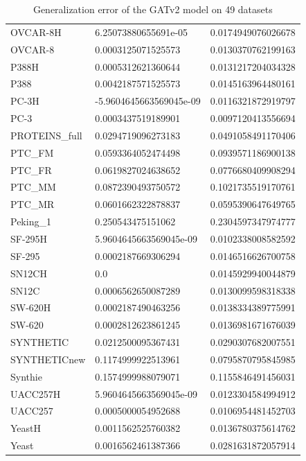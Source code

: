 \begin{table}[!ht]
\begin{tabular}{p{3.5cm}|p{5cm}p{5cm}}
    OVCAR-8H & 6.25073880655691e-05 & 0.0174949076026678 \\ 
    OVCAR-8 & 0.0003125071525573 & 0.0130370762199163 \\ 
    P388H & 0.0005312621360644 & 0.0131217204034328 \\ 
    P388 & 0.0042187571525573 & 0.0145163964480161 \\ 
    PC-3H & -5.9604645663569045e-09 & 0.0116321872919797 \\ 
    PC-3 & 0.0003437519189901 & 0.0097120413556694 \\ 
    PROTEINS\_full & 0.0294719096273183 & 0.0491058491170406 \\ 
    PTC\_FM & 0.0593364052474498 & 0.0939571186900138 \\ 
    PTC\_FR & 0.0619827024638652 & 0.0776680409908294 \\ 
    PTC\_MM & 0.0872390493750572 & 0.1021735519170761 \\ 
    PTC\_MR & 0.0601662322878837 & 0.0595390647649765 \\ 
    Peking\_1 & 0.250543475151062 & 0.2304597347974777 \\ 
    SF-295H & 5.9604645663569045e-09 & 0.0102338008582592 \\ 
    SF-295 & 0.0002187669306294 & 0.0146516626700758 \\ 
    SN12CH & 0.0 & 0.0145929940044879 \\ 
    SN12C & 0.0006562650087289 & 0.0130099598318338 \\ 
    SW-620H & 0.0002187490463256 & 0.0138334389775991 \\ 
    SW-620 & 0.0002812623861245 & 0.0136981671676039 \\ 
    SYNTHETIC & 0.0212500095367431 & 0.0290307682007551 \\ 
    SYNTHETICnew & 0.1174999922513961 & 0.0795870795845985 \\ 
    Synthie & 0.1574999988079071 & 0.1155846491456031 \\ 
    UACC257H & 5.9604645663569045e-09 & 0.0123304584994912 \\ 
    UACC257 & 0.0005000054952688 & 0.0106954481452703 \\ 
    YeastH & 0.0011562525760382 & 0.0136780375614762 \\ 
    Yeast & 0.0016562461387366 & 0.0281631872057914 \\ 
    \end{tabular}
    \caption{Generalization error of the GATv2 model on 49 datasets}
    \label{tab:ge_gatv2} %
\end{table}


